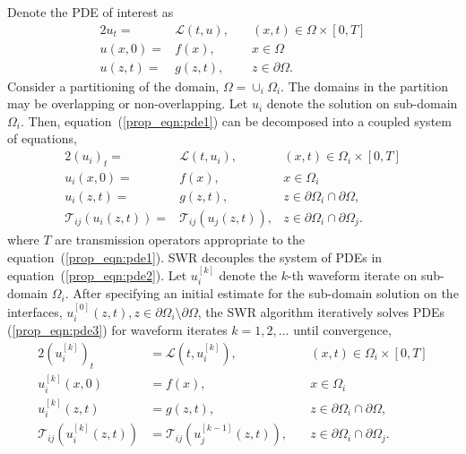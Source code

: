 \documentclass{svmult-ddm}
\begin{document}
Denote the PDE of interest as 
\begin{alignat}{2}
  \label{prop_eqn:pde1}
  u_t =&  \mathcal{L}(t,u), \quad &(x,t)\in \Omega\times[0,T]\\
  \nonumber
  u(x,0) =& f(x), \quad &x \in \Omega \\
  \nonumber
  u(z,t) =& g(z,t), \quad &z \in \partial\Omega. 
\end{alignat}
Consider a partitioning of the domain, $\Omega = \cup_i\Omega_i$.
The domains in the partition may be overlapping or non-overlapping.
Let $u_i$ denote the solution on sub-domain $\Omega_i$.
Then, equation~(\ref{prop_eqn:pde1}) can be decomposed into a
coupled system of equations,
\begin{alignat}{2}
  \label{prop_eqn:pde2}
  (u_i)_t =&  \mathcal{L}(t,u_i), &(x,t)\in \Omega_i\times[0,T]\\
  \nonumber
  u_i(x,0) =& f(x),  &x \in \Omega_i \\
  \nonumber
  u_i(z,t) =& g(z,t),  &z \in \partial\Omega_i\cap\partial\Omega, \\
  \nonumber
  \mathcal{T}_{ij}(u_{i}(z,t)) =& \mathcal{T}_{ij}(u_{j}(z,t)), &z \in \partial\Omega_i\cap\partial\Omega_j.
\end{alignat}
where $T$ are transmission operators appropriate to the
equation~(\ref{prop_eqn:pde1}).  SWR decouples the system of
PDEs in equation~(\ref{prop_eqn:pde2}).  Let $u_i^{[k]}$
denote the $k$-th waveform iterate on sub-domain $\Omega_i$. After
specifying an initial estimate for the sub-domain solution on the
interfaces, $u_i^{[0]}(z,t),
z\in\partial\Omega_i\setminus\partial\Omega$, the SWR algorithm
iteratively solves PDEs (\ref{prop_eqn:pde3}) for waveform
iterates $k=1,2,\ldots$ until convergence,
\begin{alignat}{2}
  \label{prop_eqn:pde3}
  (u_i^{[k]})_t &=  \mathcal{L}(t,u_i^{[k]}), \quad &(x,t)\in \Omega_i\times[0,T]\\
  \nonumber
  u_i^{[k]}(x,0) &= f(x), \quad &x \in \Omega_i \\
  \nonumber
  u_i^{[k]}(z,t) &= g(z,t), \quad &z \in \partial\Omega_i\cap\partial\Omega, \\
  \nonumber
  \mathcal{T}_{ij}(u_{i}^{[k]}(z,t)) &= \mathcal{T}_{ij}(u_{j}^{[k-1]}(z,t)), \quad &z \in \partial\Omega_i\cap\partial\Omega_j.
\end{alignat}
\end{document}
